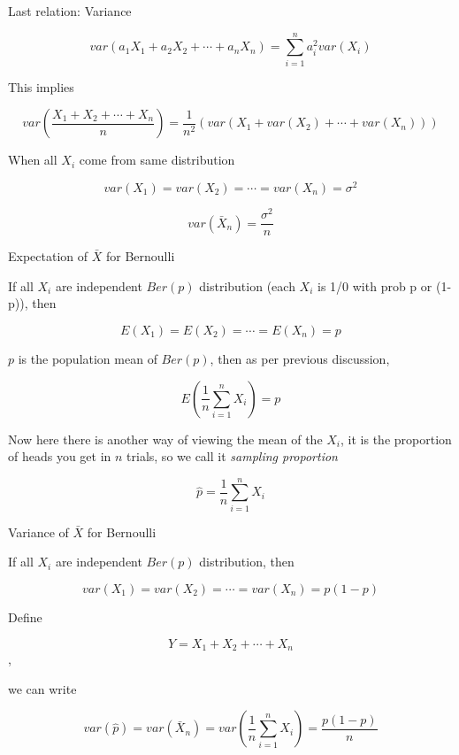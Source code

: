 \documentclass{beamer}\usepackage[]{graphicx}\usepackage[]{color}
\begin{document}
\begin{frame}{Last relation: Variance}

$$ var(a_1X_1+ a_2 X_2 + \cdots + a_nX_n) = \sum_{i=1}^{n} a^2_{i} var (X_{i}) $$ 

This implies 

$$ var \left (\frac{X_1 + X_2 + \cdots + X_{n}}{n} \right ) = \frac{1}{n^2} \left (var(X_1 + var(X_2) + \cdots + var(X_n)) \right ) $$ 

When all $X_i$ come from same distribution

$$ var(X_1) = var(X_2) = \cdots = var(X_n) = \sigma^2 $$

$$ var \left (\bar{X}_{n} \right ) = \frac{\sigma^2}{n} $$

\end{frame}

\begin{frame}{Expectation of $\bar{X}$ for Bernoulli}

If all $X_{i}$ are independent $Ber(p)$ distribution (each $X_i$ is 1/0 with prob p or (1-p)), then 

$$ E(X_1) = E(X_2) = \cdots = E(X_n) = p $$

$p$ is the population mean of $Ber(p)$, then as per previous discussion,

$$ E(\frac{1}{n} \sum_{i=1}^{n} X_i) = p $$

Now here there is another way of viewing the mean of the $X_i$, it is the proportion of heads you get in $n$ trials, so we call it \textit{sampling proportion} 

$$ \hat{p} = \frac{1}{n} \sum_{i=1}^{n} X_i $$

\end{frame}


\begin{frame}{Variance of $\bar{X}$ for Bernoulli}

If all $X_{i}$ are independent $Ber(p)$ distribution, then 

$$ var(X_1) = var(X_2) = \cdots = var(X_n) = p(1-p) $$ \pause \newline

Define 

$$ Y = X_1 + X_2 + \cdots + X_n$$, \pause

we can write

$$ var(\hat{p}) = var (\bar{X}_{n}) = var \left (\frac{1}{n} \sum_{i=1}^{n} X_{i} \right) = \frac{p(1-p)}{n} $$

\end{frame}
\end{document}
